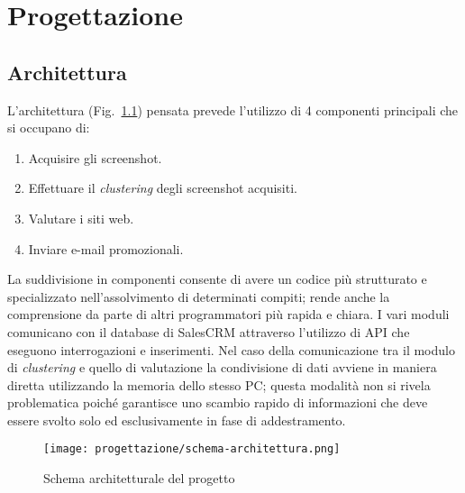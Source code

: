 \chapter{Progettazione}

\label{cap:progettazione}


\section{Architettura}
L'architettura (Fig.~\ref{fig:schema-architettura}) pensata prevede l'utilizzo di 4 componenti principali che si occupano di:
\begin{enumerate}
    \item Acquisire gli screenshot.
    \item Effettuare il \emph{clustering} degli screenshot acquisiti.
    \item Valutare i siti web.
    \item Inviare e-mail promozionali.
\end{enumerate}
La suddivisione in componenti consente di avere un codice più strutturato e specializzato nell'assolvimento di determinati compiti; rende anche la comprensione da parte di altri programmatori più rapida e chiara.
I vari moduli comunicano con il database di SalesCRM attraverso l'utilizzo di API che eseguono interrogazioni e inserimenti.
Nel caso della comunicazione tra il modulo di \emph{clustering} e quello di valutazione la condivisione di dati avviene in maniera diretta utilizzando la memoria dello stesso PC; questa modalità non si rivela problematica poiché garantisce uno scambio rapido di informazioni che deve essere svolto solo ed esclusivamente in fase di addestramento.

\begin{figure}[!h] 
    \centering 
    \texttt{[image: progettazione/schema-architettura.png]} 
    \caption{Schema architetturale del progetto}
    \label{fig:schema-architettura}
  \end{figure}


\newpage

